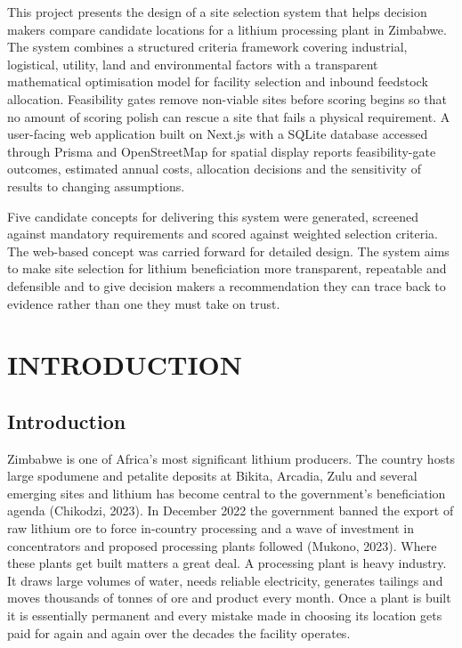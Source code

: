 \documentclass[12pt,a4paper]{report}
\begin{document}
This project presents the design of a site selection system that helps
decision makers compare candidate locations for a lithium processing
plant in Zimbabwe. The system combines a structured criteria framework
covering industrial, logistical, utility, land and environmental
factors with a transparent mathematical optimisation model for facility
selection and inbound feedstock allocation. Feasibility gates remove
non-viable sites before scoring begins so that no amount of scoring
polish can rescue a site that fails a physical requirement. A
user-facing web application built on Next.js with a SQLite database
accessed through Prisma and OpenStreetMap for spatial display reports
feasibility-gate outcomes, estimated annual costs, allocation decisions
and the sensitivity of results to changing assumptions.

Five candidate concepts for delivering this system were generated,
screened against mandatory requirements and scored against weighted
selection criteria. The web-based concept was carried forward for
detailed design. The system aims to make site selection for lithium
beneficiation more transparent, repeatable and defensible and to give
decision makers a recommendation they can trace back to evidence rather
than one they must take on trust.

\clearpage
\tableofcontents
\clearpage
\listoffigures
\clearpage
\listoftables
\clearpage


\chapter{INTRODUCTION}

\section{Introduction}
Zimbabwe is one of Africa's most significant lithium producers. The
country hosts large spodumene and petalite deposits at Bikita, Arcadia,
Zulu and several emerging sites and lithium has become central to the
government's beneficiation agenda (Chikodzi, 2023). In December 2022
the government banned the export of raw lithium ore to force in-country
processing and a wave of investment in concentrators and proposed
processing plants followed (Mukono, 2023). Where these plants get built
matters a great deal. A processing plant is heavy industry. It draws
large volumes of water, needs reliable electricity, generates tailings
and moves thousands of tonnes of ore and product every month. Once a
plant is built it is essentially permanent and every mistake made in
choosing its location gets paid for again and again over the decades
the facility operates.
\end{document}
